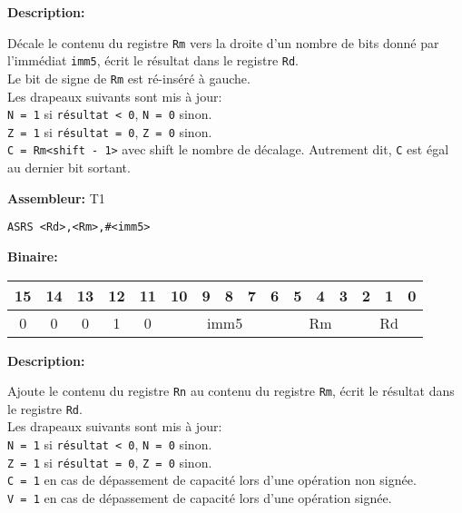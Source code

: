 \documentclass{article}
\begin{document}

    \textbf{Description: }

    Décale le contenu du registre \texttt{Rm} vers la droite d'un nombre de bits donné par l'immédiat \texttt{imm5}, écrit le résultat dans le registre \texttt{Rd}.\\
    Le bit de signe de \texttt{Rm} est ré-inséré à gauche.\\
    Les drapeaux suivants sont mis à jour:\\
    \texttt{N = 1} si \texttt{résultat < 0}, \texttt{N = 0} sinon.\\
    \texttt{Z = 1} si \texttt{résultat = 0}, \texttt{Z = 0} sinon.\\
    \texttt{C = Rm<shift - 1>} avec shift le nombre de décalage.
    Autrement dit, \texttt{C} est égal au dernier bit sortant.

    \textbf{Assembleur:} T1

    \begin{lstlisting}
ASRS <Rd>,<Rm>,#<imm5>
    \end{lstlisting}

    \textbf{Binaire:}

    \begin{tabular}{| c c c c c c c c c c c c c c c c |}
        \hline
        15 & 14 & 13 & \multicolumn{1}{|c}{12} & 11 & \multicolumn{1}{|c}{10} & 9 & 8 & 7 & 6 & \multicolumn{1}{|c}{5} & 4 & 3 & \multicolumn{1}{|c}{2} & 1 & 0 \\
        \hline
        0 & 0 & 0 & \multicolumn{1}{|c}{1} & 0 & \multicolumn{5}{|c|}{imm5} & \multicolumn{3}{|c|}{Rm} & \multicolumn{3}{|c|}{Rd} \\
        \hline
    \end{tabular}



    \textbf{Description: }

    Ajoute le contenu du registre \texttt{Rn} au contenu du registre \texttt{Rm}, écrit le résultat dans le registre \texttt{Rd}.\\
    Les drapeaux suivants sont mis à jour:\\
    \texttt{N = 1} si \texttt{résultat < 0}, \texttt{N = 0} sinon.\\
    \texttt{Z = 1} si \texttt{résultat = 0}, \texttt{Z = 0} sinon.\\
    \texttt{C = 1} en cas de dépassement de capacité lors d'une opération non signée.\\
    \texttt{V = 1} en cas de dépassement de capacité lors d'une opération signée.
\end{document}

